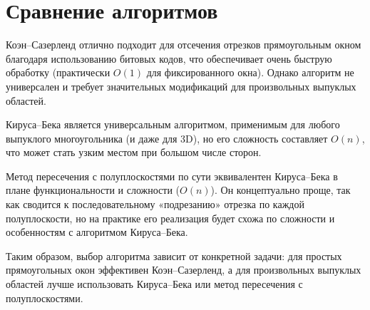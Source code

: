 \documentclass[areasetadvanced]{scrartcl}
\begin{document}
\section{Сравнение алгоритмов}
Коэн–Сазерленд отлично подходит для отсечения отрезков прямоугольным окном благодаря использованию битовых кодов, что обеспечивает очень быструю обработку (практически \(O(1)\) для фиксированного окна). Однако алгоритм не универсален и требует значительных модификаций для произвольных выпуклых областей.

Кируса–Бека является универсальным алгоритмом, применимым для любого выпуклого многоугольника (и даже для 3D), но его сложность составляет \(O(n)\), что может стать узким местом при большом числе сторон.

Метод пересечения с полуплоскостями по сути эквивалентен Кируса–Бека в плане функциональности и сложности (\(O(n)\)). Он концептуально проще, так как сводится к последовательному «подрезанию» отрезка по каждой полуплоскости, но на практике его реализация будет схожа по сложности и особенностям с алгоритмом Кируса–Бека.

Таким образом, выбор алгоритма зависит от конкретной задачи: для простых прямоугольных окон эффективен Коэн–Сазерленд, а для произвольных выпуклых областей лучше использовать Кируса–Бека или метод пересечения с полуплоскостями.

\newpage
\end{document}
